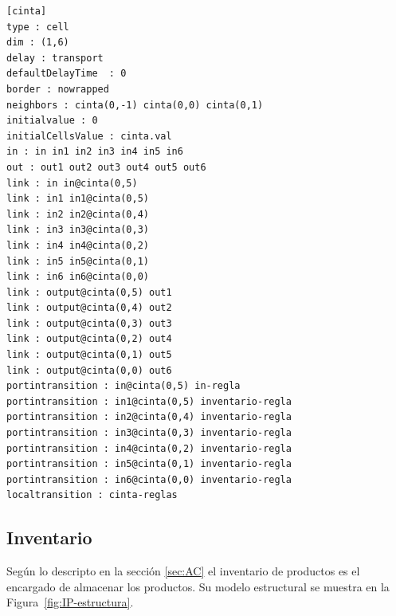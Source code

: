 \documentclass[10pt]{article}
\begin{document}
\begin{minipage}{1\textwidth}
	\centering
	\begin{lstlisting}
[cinta]
type : cell
dim : (1,6)
delay : transport
defaultDelayTime  : 0
border : nowrapped
neighbors : cinta(0,-1) cinta(0,0) cinta(0,1)
initialvalue : 0
initialCellsValue : cinta.val
in : in in1 in2 in3 in4 in5 in6
out : out1 out2 out3 out4 out5 out6
link : in in@cinta(0,5)
link : in1 in1@cinta(0,5)
link : in2 in2@cinta(0,4)
link : in3 in3@cinta(0,3)
link : in4 in4@cinta(0,2)
link : in5 in5@cinta(0,1)
link : in6 in6@cinta(0,0)
link : output@cinta(0,5) out1
link : output@cinta(0,4) out2
link : output@cinta(0,3) out3
link : output@cinta(0,2) out4
link : output@cinta(0,1) out5
link : output@cinta(0,0) out6
portintransition : in@cinta(0,5) in-regla
portintransition : in1@cinta(0,5) inventario-regla
portintransition : in2@cinta(0,4) inventario-regla
portintransition : in3@cinta(0,3) inventario-regla
portintransition : in4@cinta(0,2) inventario-regla
portintransition : in5@cinta(0,1) inventario-regla
portintransition : in6@cinta(0,0) inventario-regla
localtransition : cinta-reglas
	\end{lstlisting}
\end{minipage}

\subsection{Inventario}\label{sec:IP}
Según lo descripto en la sección \ref{sec:AC} el inventario de productos es el encargado de almacenar los productos. Su modelo estructural se muestra en la Figura~\ref{fig:IP-estructura}.
\end{document}
